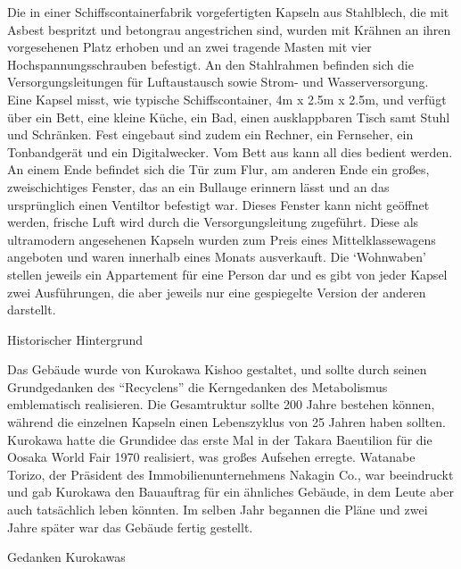 \documentclass[a4paper, 12pt]{article}
\begin{document}
\begin{onehalfspace}
Die in einer Schiffscontainerfabrik vorgefertigten Kapseln aus Stahlblech, die mit Asbest bespritzt und betongrau angestrichen sind, wurden mit Krähnen an ihren vorgesehenen Platz erhoben und an zwei tragende Masten mit vier Hochspannungsschrauben befestigt. An den Stahlrahmen befinden sich die Versorgungsleitungen für Luftaustausch sowie Strom- und Wasserversorgung. Eine Kapsel misst, wie typische Schiffscontainer, 4m x 2.5m x 2.5m, und verfügt über ein Bett, eine kleine Küche, ein Bad, einen ausklappbaren Tisch samt Stuhl und Schränken. Fest eingebaut sind zudem ein Rechner, ein Fernseher, ein Tonbandgerät und ein Digitalwecker. Vom Bett aus kann all dies bedient werden. An einem Ende befindet sich die Tür zum Flur, am anderen Ende ein großes, zweischichtiges Fenster, das an ein Bullauge erinnern lässt und an das ursprünglich einen Ventiltor befestigt war. Dieses Fenster kann nicht geöffnet werden, frische Luft wird durch die Versorgungsleitung zugeführt. Diese als ultramodern angesehenen Kapseln wurden zum Preis eines Mittelklassewagens angeboten und waren innerhalb eines Monats ausverkauft. Die ‘Wohnwaben’ stellen jeweils ein Appartement für eine Person dar und es gibt von jeder Kapsel zwei Ausführungen, die aber jeweils nur eine gespiegelte Version der anderen darstellt. 


Historischer Hintergrund

Das Gebäude wurde von Kurokawa Kishoo gestaltet, und sollte durch seinen Grundgedanken des “Recyclens” die Kerngedanken des Metabolismus emblematisch realisieren. Die Gesamtruktur sollte 200 Jahre bestehen können, während die einzelnen Kapseln einen Lebenszyklus von 25 Jahren haben sollten. Kurokawa hatte die Grundidee das erste Mal in der Takara Baeutilion für die Oosaka World Fair 1970 realisiert, was großes Aufsehen erregte. Watanabe Torizo, der Präsident des Immobilienunternehmens Nakagin Co., war beeindruckt und gab Kurokawa den Bauauftrag für ein ähnliches Gebäude, in dem Leute aber auch tatsächlich leben könnten. Im selben Jahr begannen die Pläne und zwei Jahre später war das Gebäude fertig gestellt. 


Gedanken Kurokawas


\end{onehalfspace}
\end{document}
